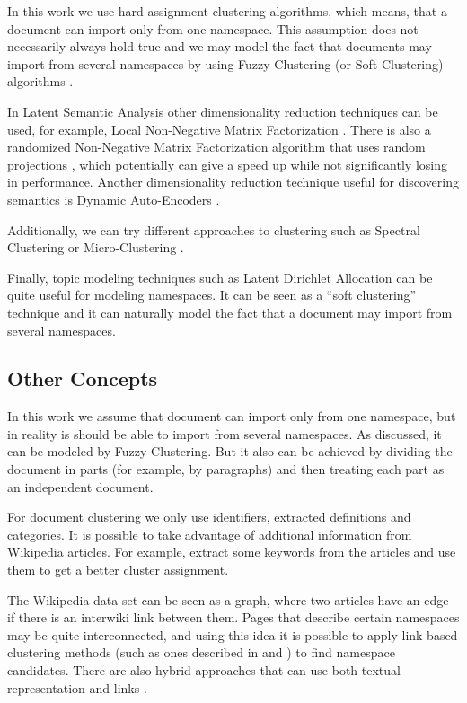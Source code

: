 In this work we use hard assignment clustering algorithms, which means, that a document
can import only from one namespace. This assumption does not necessarily always hold true
and we may model the fact that documents may import from several namespaces by
using Fuzzy Clustering (or Soft Clustering) algorithms \cite{baraldi1999survey}.

In Latent Semantic Analysis other dimensionality reduction techniques
can be used, for example, Local Non-Negative Matrix Factorization \cite{li2001learning}.
There is also a randomized Non-Negative Matrix Factorization algorithm that uses
random projections \cite{wang2010efficient} \cite{damle2014random},
which potentially can give a speed up while not significantly losing
in performance. Another dimensionality reduction technique useful for
discovering semantics is Dynamic Auto-Encoders \cite{mirowski2010dynamic}.

Additionally, we can try different approaches to clustering such as
Spectral Clustering \cite{ng2002spectral} or Micro-Clustering \cite{uno2015micro}.

Finally, topic modeling techniques such as Latent Dirichlet Allocation
\cite{blei2003latent} can be quite useful for modeling namespaces. It can be
seen as a ``soft clustering'' technique and it can naturally model the fact that
a document may import from several namespaces.


\subsection{Other Concepts} %

In this work we assume that document can import only from one namespace,
but in reality is should be able to import from several namespaces. As discussed,
it can be modeled by Fuzzy Clustering. But it also can be achieved by
dividing the document in parts (for example, by paragraphs)
and then treating each part as an independent document.

For document clustering we only use identifiers, extracted definitions
and categories. It is possible to take advantage of additional information from
Wikipedia articles. For example, extract some keywords from the articles
and use them to get a better cluster assignment.

The Wikipedia data set can be seen as a graph, where two articles have
an edge if there is an interwiki link between them. Pages that describe
certain namespaces may be quite interconnected, and using this idea it is possible
to apply link-based clustering methods (such as ones described in
\cite{botafogo1991identifying} and \cite{johnson1996adaptive}) to find namespace
candidates. There are also hybrid approaches that can use both textual representation
and links \cite{oikonomakou2005review}.

